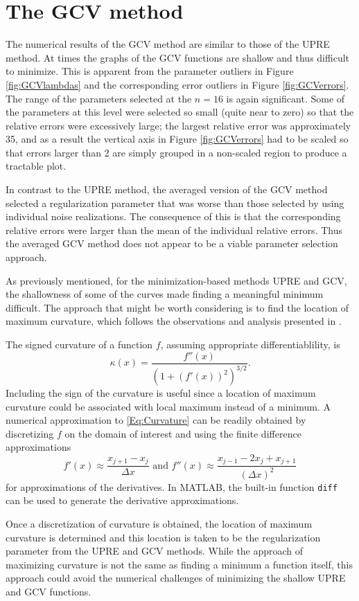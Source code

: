 \documentclass[12pt]{book}
\begin{document}
\section{The GCV method} \label{The GCV method}
The numerical results of the GCV method are similar to those of the UPRE method. At times the graphs of the GCV functions are shallow and thus difficult to minimize. This is apparent from the parameter outliers in Figure \ref{fig:GCVlambdas} and the corresponding error outliers in Figure \ref{fig:GCVerrors}. The range of the parameters selected at the $n = 16$ is again significant. Some of the parameters at this level were selected so small (quite near to zero) so that the relative errors were excessively large; the largest relative error was approximately 35, and as a result the vertical axis in Figure \ref{fig:GCVerrors} had to be scaled so that errors larger than 2 are simply grouped in a non-scaled region to produce a tractable plot. \par 
In contrast to the UPRE method, the averaged version of the GCV method selected a regularization parameter that was worse than those selected by using individual noise realizations. The consequence of this is that the corresponding relative errors were larger than the mean of the individual relative errors. Thus the averaged GCV method does not appear to be a viable parameter selection approach. \par 
As previously mentioned, for the minimization-based methods UPRE and GCV, the shallowness of some of the curves made finding a meaningful minimum difficult. The approach that might be worth considering is to find the location of maximum curvature, which follows the observations and analysis presented in \cite{HansenOLeary}. \par 
The signed curvature of a function $f$, assuming appropriate differentiablility, is
\begin{equation}
\kappa(x) = \frac{f''(x)}{(1+(f'(x))^2)^{3/2}}.
\label{Eq:Curvature}
\end{equation}
Including the sign of the curvature is useful since a location of maximum curvature could be associated with local maximum instead of a minimum. A numerical approximation to \eqref{Eq:Curvature} can be readily obtained by discretizing $f$ on the domain of interest and using the finite difference approximations
\[f'(x) \approx \frac{x_{j+1} - x_{j}}{\Delta{x}} \text{ and } f''(x) \approx \frac{x_{j-1} - 2x_j + x_{j+1}}{(\Delta{x})^2}\]
for approximations of the derivatives. In MATLAB, the built-in function \texttt{diff} can be used to generate the derivative approximations. \par 
Once a discretization of curvature is obtained, the location of maximum curvature is determined and this location is taken to be the regularization parameter from the UPRE and GCV methods. While the approach of maximizing curvature is not the same as finding a minimum a function itself, this approach could avoid the numerical challenges of minimizing the shallow UPRE and GCV functions. 
\end{document}
